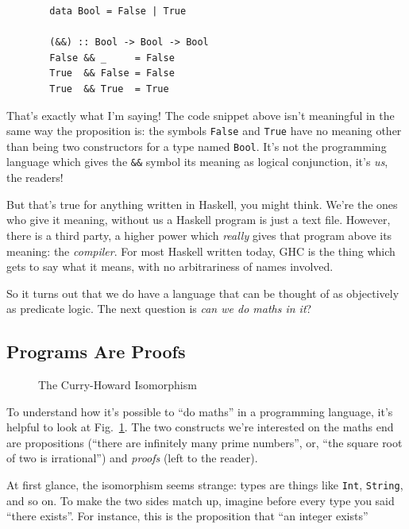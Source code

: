 \documentclass[acmsmall, screen, nonacm, timestamp, review]{acmart}
\theoremstyle{definition}
\theoremstyle{definition}
\begin{document}

\begin{figure}
\begin{verbatim}
  data Bool = False | True

  (&&) :: Bool -> Bool -> Bool
  False && _     = False
  True  && False = False
  True  && True  = True
\end{verbatim}
\end{figure}

That's exactly what I'm saying! The code snippet above isn't meaningful in the
same way the proposition is: the symbols \verb+False+ and \verb+True+ have no
meaning other than being two constructors for a type named \verb+Bool+. It's not
the programming language which gives the \verb+&&+ symbol its meaning as logical
conjunction, it's \emph{us}, the readers!

But that's true for anything written in Haskell, you might think. We're the ones
who give it meaning, without us a Haskell program is just a text file. However,
there is a third party, a higher power which \emph{really} gives that program
above its meaning: the \emph{compiler}. For most Haskell written today, GHC is
the thing which gets to say what it means, with no arbitrariness of names
involved.

So it turns out that we do have a language that can be thought of as objectively
as predicate logic. The next question is \emph{can we do maths in it}?
\pagebreak
\subsection{Programs Are Proofs}
\begin{figure}
  \centering
  \caption{The Curry-Howard Isomorphism}
  \label{CH}
\end{figure}
To understand how it's possible to ``do maths'' in a programming language, it's
helpful to look at Fig.~\ref{CH}. The two constructs we're interested on the
maths end are propositions (``there are infinitely many prime numbers'', or,
``the square root of two is irrational'') and \emph{proofs} (left to the
reader).

At first glance, the isomorphism seems strange: types are things like
\verb+Int+, \verb+String+, and so on. To make the two sides match up, imagine
before every type you said ``there exists''. For instance, this is the
proposition that ``an integer exists''
\end{document}

